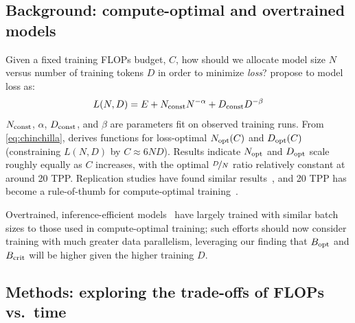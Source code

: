 \subsection{Background: compute-optimal and overtrained models}\label{sec:balancing_background}

Given a fixed training FLOPs budget, $C$, how should we allocate model
size $N$ versus number of training tokens $D$ in order to minimize
\emph{loss}?
\citet{hoffmann2022empirical} propose to model loss as:
\begin{equation}\label{eq:chinchilla}
L(N,D) = E + N_{\text{const}} N^{-\alpha} + D_{\text{const}} D^{-\beta}
\end{equation}
%
$N_{\text{const}}$, $\alpha$, $D_{\text{const}}$, and $\beta$ are parameters fit on
observed training runs.  From \cref{eq:chinchilla},
\citep{hoffmann2022empirical} derives functions for loss-optimal
$N_{\text{opt}}(C)$ and $D_{\text{opt}}(C)$ (constraining $L(N,D)$ by $C \approx 6 N
D$).
%
Results indicate $N_{\text{opt}}$ and $D_{\text{opt}}$ scale roughly equally as $C$
increases, with the optimal $\nicefrac{D}{N}$ ratio relatively
constant at around 20 TPP\@.  Replication studies have found similar
results~\citep{besiroglu2024chinchilla,porian2024resolving},
and 20 TPP has become a rule-of-thumb for compute-optimal
training~\citep{dey2023cerebras,zhang2024how}.
%

Overtrained, inference-efficient
models~\citep{touvron2023llama,biderman2023pythia,dubey2024llama} have
largely trained with similar batch sizes to those used in
compute-optimal training; such efforts should now consider training
with much greater data parallelism, leveraging our finding that
$B_{\text{opt}}$ and $B_{\text{crit}}$ will be higher given the higher training $D$.

%

\subsection{Methods: exploring the trade-offs of FLOPs vs.\ time}

